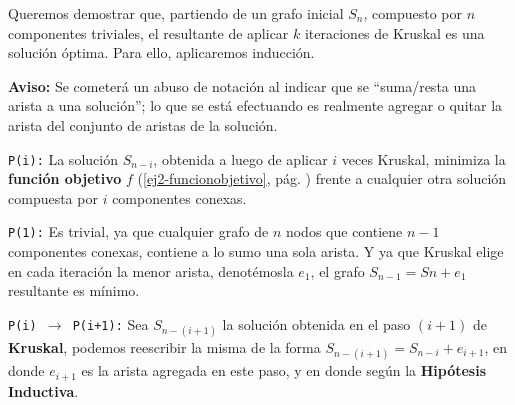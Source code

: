 \documentclass[11pt, a4paper, twoside]{article}
\begin{document}
{}

Queremos demostrar que, partiendo de un grafo inicial $S_{n}$, compuesto por $n$ componentes
triviales, el resultante de aplicar $k$ iteraciones de Kruskal es una solución óptima. 
Para ello, aplicaremos inducción.

\textbf{Aviso:} Se cometerá un abuso de notación al indicar que se
``suma/resta una arista a una solución''; lo que se está efectuando es
realmente agregar o quitar la arista del conjunto de aristas de la solución.

\texttt{P(i):} La solución $S_{n-i}$, obtenida a luego de aplicar $i$ veces Kruskal,
minimiza la \textbf{función objetivo} $f$
(\ref{ej2-funcionobjetivo}, pág. \pageref{ej2-funcionobjetivo})
frente a cualquier otra solución compuesta por $i$ componentes conexas.

\texttt{P(1):} Es trivial, ya que cualquier grafo de $n$ nodos que contiene
${n-1}$ componentes conexas, contiene a lo sumo una sola arista. 
Y ya que Kruskal elige en cada iteración la menor arista,
denotémosla $e_{1}$, el grafo $S_{n-1} = S{n} + e_{1}$ resultante es mínimo.

\texttt{P(i) $\rightarrow$ P(i+1):}
Sea $S_{n-(i+1)}$ la solución obtenida en el paso $(i+1)$ de \textbf{Kruskal},
podemos reescribir la misma de la forma $S_{n-(i+1)} = S_{n-i} + e_{i+1}$, en
donde $e_{i+1}$ es la arista agregada en este paso, y en donde  según la \textbf{Hipótesis Inductiva}.

\end{document}
